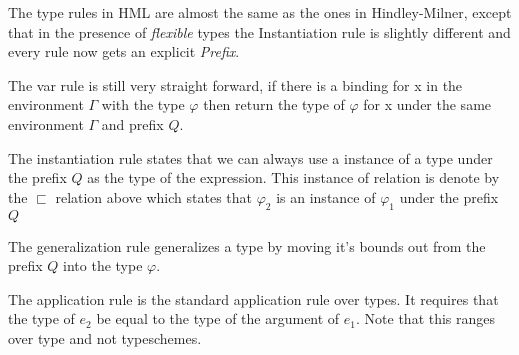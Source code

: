 \documentclass[12pt, a4paper, oneside]{article}
\begin{document}
The type rules in HML are almost the same as the ones in Hindley-Milner, except that in the presence of \textit{flexible} types the Instantiation rule is slightly different and every rule now gets an explicit \textit{Prefix}. 

\begin{prooftree}
\end{prooftree}

The var rule is still very straight forward, if there is a binding for x in the environment $\Gamma$ with the type $\varphi$ then return the type of $\varphi$ for x under the same environment $\Gamma$ and prefix $Q$.

\begin{prooftree}
\end{prooftree}

The instantiation rule states that we can always use a instance of a type under the prefix $Q$ as the type of the expression. This instance of relation is denote by the $\sqsubset$ relation above which states that $\varphi_2$ is an instance of $\varphi_1$ under the prefix $Q$

\begin{prooftree}
\end{prooftree}

The generalization rule generalizes a type by moving it's bounds out from the prefix $Q$ into the type $\varphi$.

\begin{prooftree}
\end{prooftree}

The application rule is the standard application rule over types. It requires that the type of $e_2$ be equal to the type of the argument of $e_1$. Note that this ranges over type and not typeschemes.

\begin{prooftree}
\end{prooftree}
\end{document}
